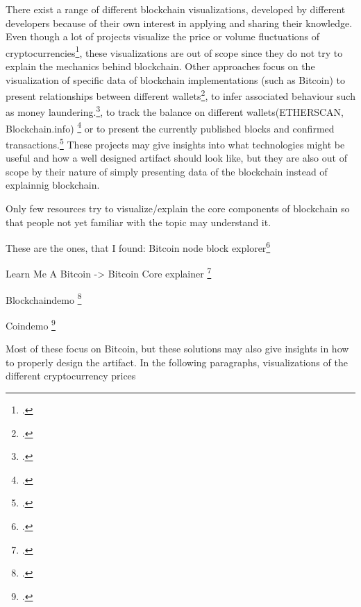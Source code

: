 There exist a range of different blockchain visualizations, developed by different developers because of their own interest in applying and sharing their knowledge. Even though a lot of projects visualize the price or volume fluctuations of cryptocurrencies\footcites[Cf.][]{SapekCryptowatchliveBitcoin2014}[cf.][]{CryptoMapsCryptocurrencyMarket}, these visualizations are out of scope since they do not try to explain the mechanics behind blockchain. Other approaches focus on the visualization of specific data of blockchain implementations (such as Bitcoin) to present relationships between different wallets\footcites[Cf.][]{Reidanalysisanonymitybitcoin2013}[cf.][]{BaumannExploringBitcoinnetwork2014}[cf.][]{Interaqt2016},  to infer associated behaviour such as money laundering.\footcites[Cf.][]{Meiklejohnfistfulbitcoinscharacterizing2013}[cf.][]{EllipticEnterprisesLimitedEllipticBitcoinBig}, to track the balance on different wallets(ETHERSCAN, Blockchain.info) \footcites[Cf.][]{EtherScanEthereumBlock}[cf.][]{BlcokchainLuxembourgS.A.R.L.BlockchaininfoBitcoin} or to present the currently published blocks and confirmed transactions.\footcites[Cf.][]{BitcoinCityinfoRoad}[cf.][]{Bitbonkers2016}[cf.][]{BlockSeer2015}[cf.][]{DailyBlockchainBlockchain2013}[cf][]{YeowBitcoinNodesGlobal2018}[cf.][]{LaumeisterBitListenBitcoinTransaction2015}[cf.][]{MillerBitcoinVisualizer2015}[cf.][]{VisualizingBitcoinTransactions2015}[cf.][]{Blockchain3DExplorer2017} These projects may give insights into what technologies might be useful and how a well designed artifact should look like, but they are also out of scope by their nature of simply presenting data of the blockchain instead of explainnig blockchain.

Only few resources try to visualize/explain the core components of blockchain so that people not yet familiar with the topic may understand it.

These are the ones, that I found:
Bitcoin node block explorer\footcite[Cf.][]{JornCYoghBlockchainReader2017}

Learn Me A Bitcoin -> Bitcoin Core explainer \footcite[Cf.][]{WalkerLearnmeBitcoin2016}

Blockchaindemo \footcites[Cf.][]{HanHowdoesblockchain2017}[cf.][]{HanBlockchainDemo2017}

Coindemo \footcites[Cf.][]{HanHowdoesbitcoin2017}[cf.][]{HanCoinDemo2017}





Most of these focus on Bitcoin, but these solutions may also give insights in how to properly design the artifact. In the following paragraphs, visualizations of the different cryptocurrency prices